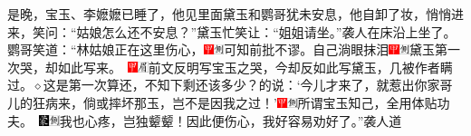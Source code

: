 {是晚，宝玉、李嬷嬷已睡了，他见里面黛玉和鹦哥犹未安息，他自卸了妆，悄悄进来，笑问：“姑娘怎么还不安息？”黛玉忙笑让：“姐姐请坐。”袭人在床沿上坐了。鹦哥笑道：“林姑娘正在这里伤心，{\includegraphics[width=3mm]{../Images/00002}\includegraphics[width=3mm]{../Images/00011}\footnotesize \kaishu 可知前批不谬。}自己淌眼抹泪{\includegraphics[width=3mm]{../Images/00002}\includegraphics[width=3mm]{../Images/00011}\footnotesize \kaishu 黛玉第一次哭，却如此写来。　\includegraphics[width=3mm]{../Images/00002}\includegraphics[width=3mm]{../Images/00010}\footnotesize \kaishu 前文反明写宝玉之哭，今却反如此写黛玉，几被作者瞒过。{$\diamond$}这是第一次算还，不知下剩还该多少？}的说：‘今儿才来了，就惹出你家哥儿的狂病来，倘或摔坏那玉，岂不是因我之过！’{{\includegraphics[width=3mm]{../Images/00002}\includegraphics[width=3mm]{../Images/00011}\footnotesize \kaishu 所谓宝玉知己，全用体贴功夫。　}\includegraphics[width=3mm]{../Images/00006}\includegraphics[width=3mm]{../Images/00011}\footnotesize \kaishu 我也心疼，岂独颦颦！}因此便伤心，我好容易劝好了。”袭人道}
